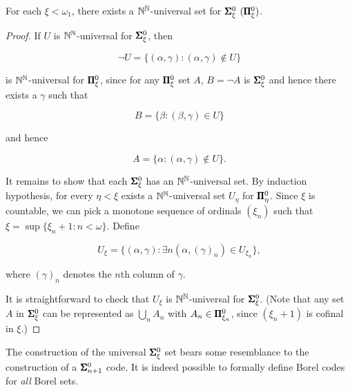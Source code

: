 \begin{proposition}\label{prop-universal-general}For each $\xi < \omega_1$, there exists a $\mathbb{N}^{\mathbb{N}}$-universal set for $\pmb{\Sigma}^0_{\xi}$ $(\pmb{\Pi}^0_{\xi})$.

\end{proposition}\begin{proof}If $U$ is $\mathbb{N}^{\mathbb{N}}$-universal for $\pmb{\Sigma}^0_\xi$, then

\begin{equation}
\neg U = \{ (\alpha,\gamma) \colon (\alpha,\gamma) \not\in U \}
\end{equation}

is $\mathbb{N}^{\mathbb{N}}$-universal for $\pmb{\Pi}^0_\xi$, since for any $\pmb{\Pi}^0_\xi$ set $A$, $B = \neg A$ is $\pmb{\Sigma}^0_\xi$ and hence there exists a $\gamma$ such that

\begin{equation}
B = \{\beta \colon (\beta,\gamma) \in U \}
\end{equation}

and hence

\begin{equation}
A = \{ \alpha \colon (\alpha,\gamma) \not\in U \}.
\end{equation}

It remains to show that each $\pmb{\Sigma}^0_{\xi}$ has an $\mathbb{N}^{\mathbb{N}}$-universal set. By induction hypothesis, for every $\eta < \xi$ exists a $\mathbb{N}^{\mathbb{N}}$-universal set $U_\eta$ for $\pmb{\Pi}^0_{\eta}$. Since $\xi$ is countable, we can pick a monotone  sequence of ordinals $(\xi_n)$ such that $\xi = \sup \{\xi_n + 1 \colon n < \omega \}$. Define

\begin{equation}
U_\xi =  \{ (\alpha, \gamma) \colon \exists n (\alpha, (\gamma)_n) \in U_{\xi_n} \},
\end{equation}

where $(\gamma)_n$ denotes the $n$th column of $\gamma$.

It is straightforward to check that $U_\xi$ is $\mathbb{N}^{\mathbb{N}}$-universal for $\pmb{\Sigma}^0_{\xi}$. (Note that any set $A$ in $\pmb{\Sigma}^0_{\xi}$ can be represented as $\bigcup_n A_n$ with $A_n \in \pmb{\Pi}^0_{\xi_n}$, since $(\xi_n+1)$ is cofinal in $\xi$.)

\end{proof}The construction of the universal $\pmb{\Sigma}^0_{\xi}$ set bears some resemblance to the construction of a $\pmb{\Sigma}^0_{n+1}$ code. It is indeed possible to formally define Borel codes for \textit{all} Borel sets.

